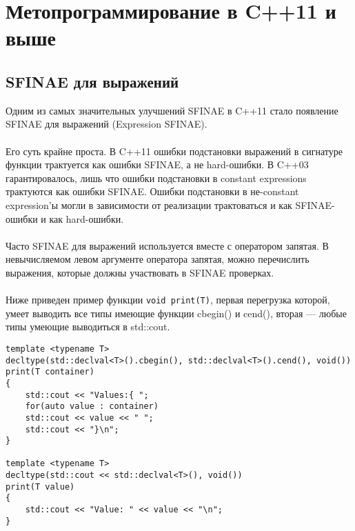 \section{Метопрограммирование в C++11 и выше}
\subsection{SFINAE для выражений}
Одним из самых значительных улучшений SFINAE в C++11 стало появление SFINAE для выражений (Expression SFINAE). \\\\
Его суть крайне проста. В C++11 ошибки подстановки выражений в сигнатуре функции трактуется как ошибки SFINAE, а не hard-ошибки.
В C++03 гарантировалось, лишь что ошибки подстановки в constant expressions трактуются как ошибки SFINAE. Ошибки подстановки в не-constant expression'ы могли в зависимости от реализации трактоваться и как SFINAE-ошибки и как hard-ошибки. \\\\
Часто SFINAE для выражений используется вместе с оператором запятая. В невычисляемом левом аргументе оператора запятая, можно перечислить выражения, которые должны участвовать в SFINAE проверках. \\\\
Ниже приведен пример функции \texttt{void print(T)}, первая перегрузка которой, умеет выводить все типы имеющие функции cbegin() и cend(), вторая --- любые типы умеющие выводиться в std::cout.
\begin{verbatim}
template <typename T>
decltype(std::declval<T>().cbegin(), std::declval<T>().cend(), void())
print(T container)
{
	std::cout << "Values:{ ";
	for(auto value : container)
	std::cout << value << " ";
	std::cout << "}\n";
}

template <typename T>
decltype(std::cout << std::declval<T>(), void())
print(T value)
{
	std::cout << "Value: " << value << "\n";
}	
\end{verbatim}
